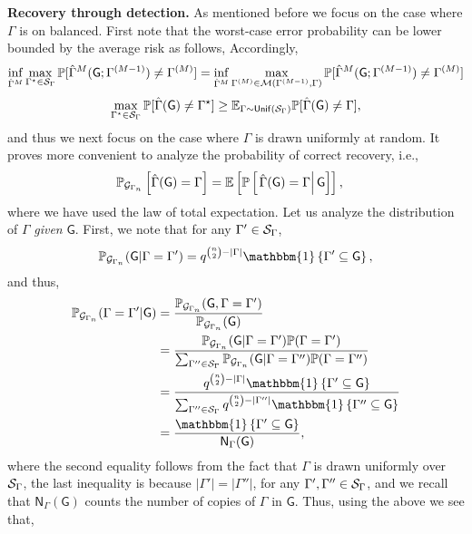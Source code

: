 \documentclass[12pt]{article}
\newcommand{\bE}{\mathbb{E}}
\newcommand{\Ind}{\mathbbm{1}}
\newcommand {\pr} {\mathbb{P}}
\newcommand{\calG}{{\cal G}}
\newcommand{\calM}{{\cal M}}
\newcommand{\calS}{{\cal S}}
\newcommand{\pp}[1]{\left[#1\right]}
\newcommand{\ppp}[1]{\left\{#1\right\}}
\newcommand{\s}[1]{\mathsf{#1}}
\begin{document}
\noindent\textbf{Recovery through detection.} As mentioned before we focus on the case where $\Gamma$ is on balanced. First note that the worst-case error probability can be lower bounded by the average risk as follows,
Accordingly, 
\begin{align}
    \inf_{\hat{\Gamma}^M}\max_{\Gamma^\star\in\calS_{\Gamma}}\pr[\hat{\Gamma}^M(\s{G};\Gamma^{(M-1)})\neq\Gamma^{(M)}] = \inf_{\hat{\Gamma}^M}\max_{\Gamma^{(M)}\in\calM(\Gamma^{(M-1)},\Gamma)}\pr[\hat{\Gamma}^M(\s{G};\Gamma^{(M-1)})\neq\Gamma^{(M)}]
\end{align}
\begin{align}
    \max_{\Gamma^\star\in\calS_{\Gamma}}\pr[\hat{\Gamma}(\s{G})\neq\Gamma^\star]\geq \bE_{\Gamma\sim\s{Unif}(\calS_\Gamma)}\pr[\hat{\Gamma}(\s{G})\neq\Gamma],\label{eqn:worst-caseRec}
\end{align}
and thus we next focus on the case where $\Gamma$ is drawn uniformly at random. It proves more convenient to analyze the probability of correct recovery, i.e.,
\begin{align}
     \pr_{\calG_{\Gamma_n}}\pp{\hat{\Gamma}(\s{G})=\Gamma} &= \bE\pp{\pr\pp{\left.\hat{\Gamma}(\s{G})=\Gamma\right|\s{G}}},
\end{align}
where we have used the law of total expectation. Let us analyze the distribution of $\Gamma$ \emph{given} $\s{G}$. First, we note that for any $\Gamma'\in\calS_{\Gamma}$,
\begin{align}
    \pr_{\calG_{\Gamma_n}}(\s{G}\vert\Gamma=\Gamma') = q^{\binom{n}{2}-|\Gamma|}\Ind\ppp{\Gamma'\subseteq \s{G}},
\end{align}
and thus, 
\begin{align}
    \pr_{\calG_{\Gamma_n}}(\Gamma=\Gamma'\vert \s{G}) &= \frac{\pr_{\calG_{\Gamma_n}}(\s{G},\Gamma=\Gamma')}{\pr_{\calG_{\Gamma_n}}(\s{G})}\\
     &= \frac{\pr_{\calG_{\Gamma_n}}(\s{G}\vert\Gamma=\Gamma')\pr(\Gamma=\Gamma')}{\sum_{\Gamma''\in\calS_{\Gamma}}\pr_{\calG_{\Gamma_n}}(\s{G}\vert\Gamma=\Gamma'')\pr(\Gamma=\Gamma'')}\\
     &=\frac{q^{\binom{n}{2}-|\Gamma|}\Ind\ppp{\Gamma'\subseteq \s{G}}}{\sum_{\Gamma''\in\calS_{\Gamma}}q^{\binom{n}{2}-|\Gamma''|}\Ind\ppp{\Gamma''\subseteq \s{G}}}\\
    & = \frac{\Ind\ppp{\Gamma'\subseteq \s{G}}}{\s{N}_{\Gamma}(\s{G})},
\end{align}
where the second equality follows from the fact that $\Gamma$ is drawn uniformly over $\calS_{\Gamma}$, the last inequality is because $|\Gamma'|=|\Gamma''|$, for any $\Gamma',\Gamma''\in\calS_{\Gamma}$, and we recall that $\s{N}_{\Gamma}(\s{G})$ counts the number of copies of $\Gamma$ in $\s{G}$. Thus, using the above we see that,
\end{document}
